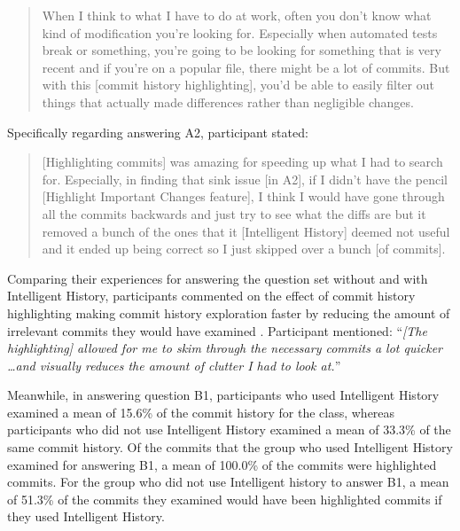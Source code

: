 \begin{quote}
  When I think to what I have to do at work, 
  often you don’t know what kind of modification you’re looking for. 
  Especially when automated tests break or something, 
  you’re going to be looking for something that is very recent and if you’re on a popular file, 
  there might be a lot of commits. 
  But with this [commit history highlighting], 
  you’d be able to easily filter out things that actually made differences rather than negligible changes.
\end{quote}

Specifically regarding answering A2, participant  stated:

\begin{quote}
  [Highlighting commits] was amazing for speeding up what I had to search for. 
  Especially, in finding that sink issue [in A2], if I didn’t have the pencil [Highlight Important Changes feature], 
  I think I would have gone through all the commits backwards and just try to see what the diffs are 
  but it removed a bunch of the ones that it [Intelligent History] deemed not useful and it ended up being correct so I just skipped over a bunch [of commits].
\end{quote}

Comparing their experiences for answering the question set without and with Intelligent History, 
participants commented on the effect of commit history highlighting making commit history exploration faster by reducing the amount of irrelevant commits they would have examined .
Participant  mentioned: 
``\textit{[The highlighting] allowed for me to skim through the necessary commits a lot quicker \dots and visually reduces the amount of clutter I had to look at.}''

Meanwhile, in answering question B1, participants who used Intelligent History examined a mean of 15.6\% of the commit history for the  class,
whereas participants who did not use Intelligent History examined a mean of 33.3\% of the same commit history.
Of the commits that the group who used Intelligent History examined for answering B1, a mean of 100.0\% of the commits were highlighted commits.
For the group who did not use Intelligent history to answer B1, a mean of 51.3\% of the commits they examined would have been highlighted commits if they used Intelligent History.

